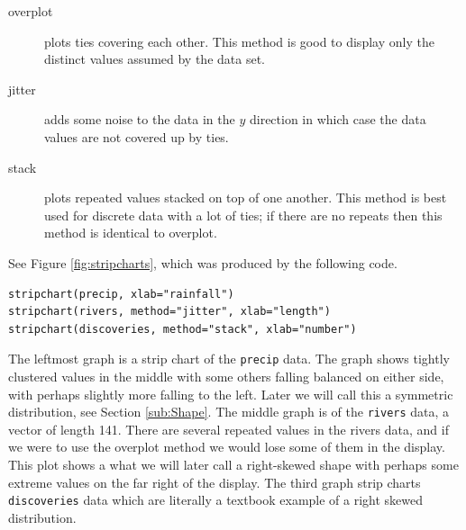 \documentclass[captions=tableheading]{scrbook}
\begin{document}
\begin{description}
\item[overplot] plots ties covering each other. This method is good to display only the distinct values assumed by the data set.
\item[jitter] adds some noise to the data in the \(y\) direction in which case the data values are not covered up by ties.
\item[stack] plots repeated values stacked on top of one another. This method is best used for discrete data with a lot of ties; if there are no repeats then this method is identical to overplot.
\end{description}

See Figure \ref{fig:stripcharts}, which was produced by the following code.


\begin{verbatim}
stripchart(precip, xlab="rainfall")
stripchart(rivers, method="jitter", xlab="length")
stripchart(discoveries, method="stack", xlab="number")
\end{verbatim}

The leftmost graph is a strip chart of the \texttt{precip} data. The graph shows tightly clustered values in the middle with some others falling balanced on either side, with perhaps slightly more falling to the left. Later we will call this a symmetric distribution, see Section \ref{sub:Shape}. The middle graph is of the \texttt{rivers} data, a vector of length 141. There are several repeated values in the rivers data, and if we were to use the overplot method we would lose some of them in the display. This plot shows a what we will later call a right-skewed shape with perhaps some extreme values on the far right of the display. The third graph strip charts \texttt{discoveries} data which are literally a textbook example of a right skewed distribution.
\end{document}
